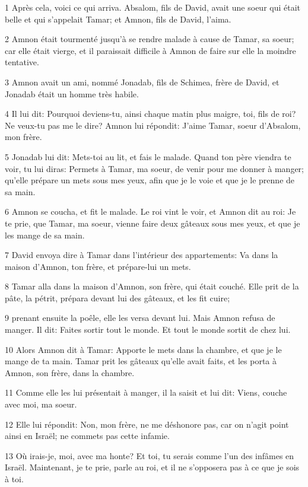 \par 1 Après cela, voici ce qui arriva. Absalom, fils de David, avait une soeur qui était belle et qui s'appelait Tamar; et Amnon, fils de David, l'aima.
\par 2 Amnon était tourmenté jusqu'à se rendre malade à cause de Tamar, sa soeur; car elle était vierge, et il paraissait difficile à Amnon de faire sur elle la moindre tentative.
\par 3 Amnon avait un ami, nommé Jonadab, fils de Schimea, frère de David, et Jonadab était un homme très habile.
\par 4 Il lui dit: Pourquoi deviens-tu, ainsi chaque matin plus maigre, toi, fils de roi? Ne veux-tu pas me le dire? Amnon lui répondit: J'aime Tamar, soeur d'Absalom, mon frère.
\par 5 Jonadab lui dit: Mets-toi au lit, et fais le malade. Quand ton père viendra te voir, tu lui diras: Permets à Tamar, ma soeur, de venir pour me donner à manger; qu'elle prépare un mets sous mes yeux, afin que je le voie et que je le prenne de sa main.
\par 6 Amnon se coucha, et fit le malade. Le roi vint le voir, et Amnon dit au roi: Je te prie, que Tamar, ma soeur, vienne faire deux gâteaux sous mes yeux, et que je les mange de sa main.
\par 7 David envoya dire à Tamar dans l'intérieur des appartements: Va dans la maison d'Amnon, ton frère, et prépare-lui un mets.
\par 8 Tamar alla dans la maison d'Amnon, son frère, qui était couché. Elle prit de la pâte, la pétrit, prépara devant lui des gâteaux, et les fit cuire;
\par 9 prenant ensuite la poêle, elle les versa devant lui. Mais Amnon refusa de manger. Il dit: Faites sortir tout le monde. Et tout le monde sortit de chez lui.
\par 10 Alors Amnon dit à Tamar: Apporte le mets dans la chambre, et que je le mange de ta main. Tamar prit les gâteaux qu'elle avait faits, et les porta à Amnon, son frère, dans la chambre.
\par 11 Comme elle les lui présentait à manger, il la saisit et lui dit: Viens, couche avec moi, ma soeur.
\par 12 Elle lui répondit: Non, mon frère, ne me déshonore pas, car on n'agit point ainsi en Israël; ne commets pas cette infamie.
\par 13 Où irais-je, moi, avec ma honte? Et toi, tu serais comme l'un des infâmes en Israël. Maintenant, je te prie, parle au roi, et il ne s'opposera pas à ce que je sois à toi.
